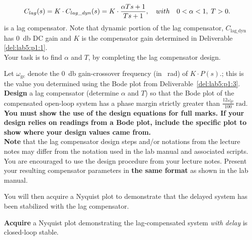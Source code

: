 \[
  C_{lag}(s)=K \cdot C_{lag\_dyn}(s) \\ 
   = K \cdot \frac{\alpha T s + 1}{T s + 1}, \quad with 
   \quad 0 < \alpha < 1
  ,
  \;
  T > 0.
\]
is a lag compensator. Note that dynamic portion of the lag compensator, \(C_\mathrm{lag\_dyn}\) has \SI{0}{\decibel} DC gain and \(K\) is the compensator gain determined in Deliverable  \ref{del:lab5:p1:1}.\\
Your task is to find \(\alpha\) and \(T\), by completing the lag compensator design.\\
%
\begin{deliverable}[label={del:lab5:p2:1}]
  Let \(\omega_\mathrm{gc}\) denote the \SI{0}{\decibel} gain-crossover frequency (in \SI{}{\radian}) of \(K \cdot P(s).\); this is the value you determined using the Bode plot from Deliverable~\ref{del:lab5:p1:3}.
  \textbf{Design} a lag compensator (determine \(\alpha\) and \(T\)) so that the Bode plot of the compensated open-loop system has a phase margin strictly greater than \(\frac{12\omega_\mathrm{gc}}{100}~\mathrm{rad}.\)\\
  \textbf{You must show the use of the design equations for full marks. If your design relies on readings from a Bode plot, include the specific plot to show where your design values came from.}\\
  \textbf{Note} that the lag compensator design steps and/or notations from the lecture notes may differ from the notation used in the lab manual and associated scripts. You are encouraged to use the design procedure from your lecture notes. Present your resulting compensator parameters in \textbf{the same format} as shown in the lab manual.\\
\end{deliverable}
%
You will then acquire a Nyquist plot to demonstrate that the delayed system has been stabilized with the lag compensator.
%
\begin{deliverable}[label={del:lab5:p2:2}]
  \textbf{Acquire} a Nyquist plot demonstrating the lag-compensated system \emph{with delay} is closed-loop stable.
\end{deliverable}
%
